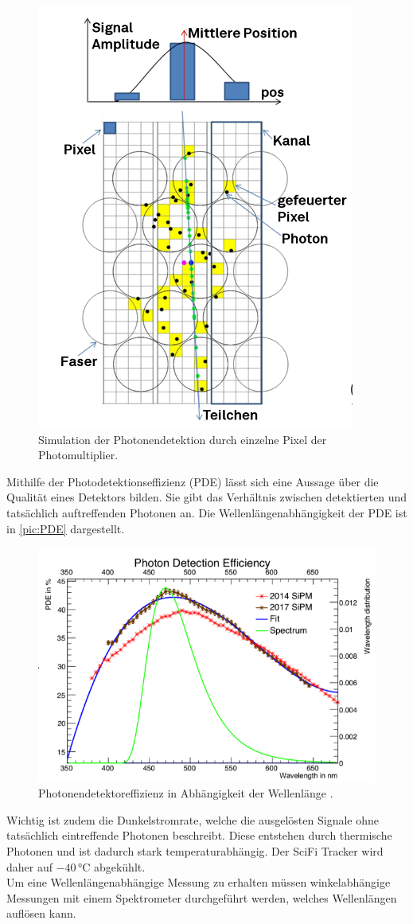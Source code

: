 \begin{figure}
    \centering
    \includegraphics[width = .4\textwidth]{content/pics/Pixel_kanal.png}
    \caption{Simulation der Photonendetektion durch einzelne Pixel der Photomultiplier. \cite{SciFi_Versuch}}
    \label{pic:Pixel}
\end{figure}

Mithilfe der Photodetektionseffizienz (PDE) lässt sich eine Aussage über die Qualität eines Detektors bilden. Sie gibt das Verhältnis zwischen 
detektierten und tatsächlich auftreffenden Photonen an. Die Wellenlängenabhängigkeit der PDE ist in \autoref{pic:PDE} dargestellt.\\

\begin{figure}
    \centering
    \includegraphics[width = .8\textwidth]{content/pics/PDE.png}
    \caption{Photonendetektoreffizienz in Abhängigkeit der Wellenlänge \cite{SciFi_Versuch}.}
    \label{pic:PDE}
\end{figure}

Wichtig ist zudem die Dunkelstromrate, welche die ausgelösten Signale ohne tatsächlich eintreffende Photonen beschreibt. Diese entstehen durch
thermische Photonen und ist dadurch stark temperaturabhängig. Der SciFi Tracker wird daher auf $-40 \, ° \mathrm{C}$ abgekühlt.\\
Um eine Wellenlängenabhängige Messung zu erhalten müssen winkelabhängige Messungen mit einem Spektrometer durchgeführt werden, welches Wellenlängen auflösen kann.

